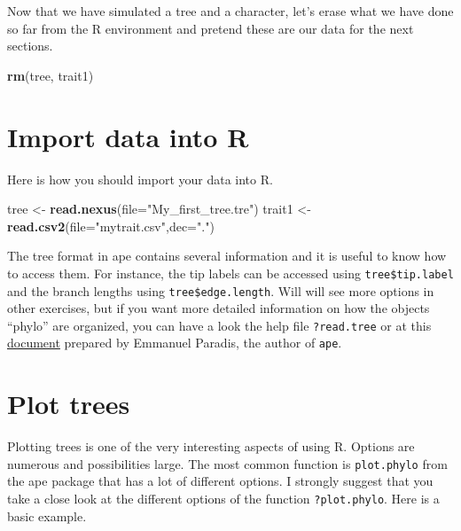 \documentclass[
]{book}
\newenvironment{Shaded}{\begin{snugshade}}{\end{snugshade}}
\newcommand{\AttributeTok}[1]{\textcolor[rgb]{0.13,0.29,0.53}{#1}}
\newcommand{\FunctionTok}[1]{\textcolor[rgb]{0.13,0.29,0.53}{\textbf{#1}}}
\newcommand{\NormalTok}[1]{#1}
\newcommand{\OtherTok}[1]{\textcolor[rgb]{0.56,0.35,0.01}{#1}}
\newcommand{\StringTok}[1]{\textcolor[rgb]{0.31,0.60,0.02}{#1}}
\begin{document}
Now that we have simulated a tree and a character, let's erase what we have done so far from the R environment and pretend these are our data for the next sections.

\begin{Shaded}
\begin{Highlighting}[]
\FunctionTok{rm}\NormalTok{(tree, trait1)}
\end{Highlighting}
\end{Shaded}

\section{Import data into R}\label{import-data-into-r}

Here is how you should import your data into R.

\begin{Shaded}
\begin{Highlighting}[]
\NormalTok{tree }\OtherTok{\textless{}{-}} \FunctionTok{read.nexus}\NormalTok{(}\AttributeTok{file=}\StringTok{"My\_first\_tree.tre"}\NormalTok{)}
\NormalTok{trait1 }\OtherTok{\textless{}{-}} \FunctionTok{read.csv2}\NormalTok{(}\AttributeTok{file=}\StringTok{"mytrait.csv"}\NormalTok{,}\AttributeTok{dec=}\StringTok{"."}\NormalTok{)}
\end{Highlighting}
\end{Shaded}

The tree format in ape contains several information and it is useful to know how to access them. For instance, the tip labels can be accessed using \texttt{tree\$tip.label} and the branch lengths using \texttt{tree\$edge.length}. Will will see more options in other exercises, but if you want more detailed information on how the objects ``phylo'' are organized, you can have a look the help file \texttt{?read.tree} or at this \href{http://ape-package.ird.fr/misc/FormatTreeR_24Oct2012.pdf}{document} prepared by Emmanuel Paradis, the author of \texttt{ape}.

\section{Plot trees}\label{plot-trees}

Plotting trees is one of the very interesting aspects of using R. Options are numerous and possibilities large. The most common function is \texttt{plot.phylo} from the ape package that has a lot of different options. I strongly suggest that you take a close look at the different options of the function \texttt{?plot.phylo}. Here is a basic example.
\end{document}
